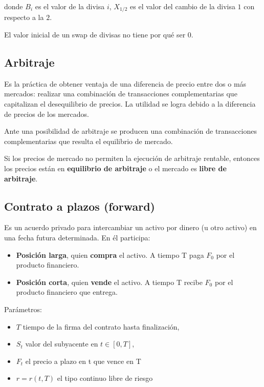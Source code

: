 \documentclass[
10pt, %
a4paper, %
oneside, %
headinclude,footinclude, %
BCOR5mm, %
]{scrartcl}
\newcommand{\n}[1]{\textbf{#1}}
\newcommand{\sub}[1]{_{#1}}
\newcommand{\f}[1]{{\large{${#1}$}}}
\newcounter{ex}
\begin{document}
				donde \f{B\sub{i}} es el valor de la divisa \f{i}, \f{X\sub{1/2}} es el valor del cambio de la divisa \f{1} con respecto a la \f{2}.

				El valor inicial de un swap de divisas no tiene por qué ser \f{0}.

	\subsection{Arbitraje}

		Es la práctica de obtener ventaja de una diferencia de precio entre dos o más mercados: realizar una combinación de transacciones complementarias que capitalizan el desequilibrio de precios. La utilidad se logra debido a la diferencia de precios de los mercados.

		Ante una posibilidad de arbitraje se producen una combinación de transacciones complementarias que resulta el equilibrio de mercado.

		Si los precios de mercado no permiten la ejecución de arbitraje rentable, entonces los precios están en \n{equilibrio de arbitraje} o el mercado es \n{libre de arbitraje}.

	\subsection{Contrato a plazos (forward)}

		Es un acuerdo privado para intercambiar un activo por dinero (u otro activo) en una fecha futura determinada. En él participa:
		\begin{itemize}
			\item \n{Posición larga}, quien \n{compra} el activo. A tiempo T paga \f{F\sub{0}} por el producto financiero.
			\item \n{Posición corta}, quien \n{vende} el activo. A tiempo T recibe \f{F\sub{0}} por el producto financiero que entrega.
		\end{itemize}

		Parámetros: 
		\begin{multicols}{2}
		\begin{itemize}
			\item \f{T} tiempo de la firma del contrato hasta finalización, 
			\item \f{S\sub{t}} valor del subyacente en \f{t \in [0,T]}, 
			\item \f{F\sub{t}} el precio a plazo en t que vence en T
			\item \f{r = r(t,T)} el tipo continuo libre de riesgo
		\end{itemize}
		\end{multicols}
\end{document}
